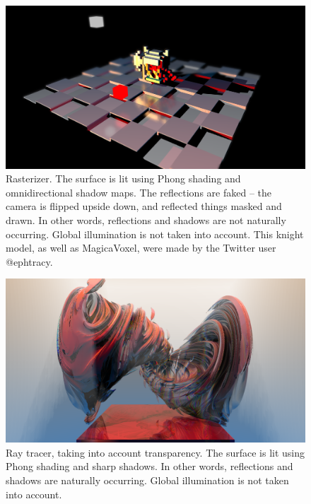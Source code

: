 \documentclass[12pt]{article}
\begin{document}
\pagebreak




\begin{figure} 
\centering
  \includegraphics[width = 6 in]{rasterizer.png}
  \caption{ Rasterizer.
The surface is lit using Phong shading and omnidirectional shadow maps.
The reflections are faked -- the camera is flipped upside down, and reflected things masked and drawn.
In other words, reflections and shadows are not naturally occurring.
Global illumination is not taken into account.
This knight model, as well as MagicaVoxel, were made by the Twitter user @ephtracy.
}

\end{figure}




\begin{figure} 
\centering
  \includegraphics[width = 6 in]{v_rt_reflect.png}
  \caption{ Ray tracer, taking into account transparency.
The surface is lit using Phong shading and sharp shadows.
In other words, reflections and shadows are naturally occurring.
Global illumination is not taken into account.
}
\end{figure}
\end{document}
